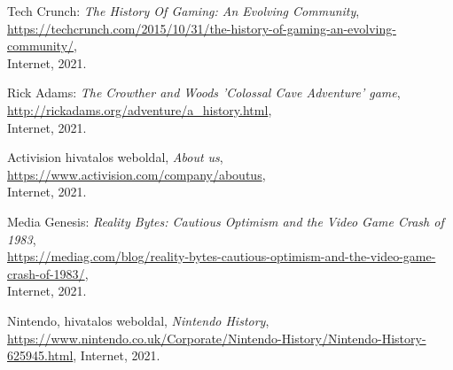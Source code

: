 \begin{thebibliography}{x}
	Tech Crunch: \emph{The History Of Gaming: An Evolving Community}, \\
	\url{https://techcrunch.com/2015/10/31/the-history-of-gaming-an-evolving-community/}, \\
	Internet, 2021.
	
	Rick Adams: \emph{The Crowther and Woods 'Colossal Cave Adventure' game}, \\
	\url{http://rickadams.org/adventure/a_history.html}, \\
	Internet, 2021.
	
	
	Activision hivatalos weboldal, \emph{About us}, \\
	\url{https://www.activision.com/company/aboutus}, \\
	Internet, 2021.
	
	Media Genesis: \emph{Reality Bytes: Cautious Optimism and the Video Game Crash of 1983}, \\
	\url{https://mediag.com/blog/reality-bytes-cautious-optimism-and-the-video-game-crash-of-1983/}, \\
	Internet, 2021.
	
		
	Nintendo, hivatalos weboldal, \emph{Nintendo History}, \\
	\url{https://www.nintendo.co.uk/Corporate/Nintendo-History/Nintendo-History-625945.html},
	Internet, 2021.
	

\end{thebibliography}
